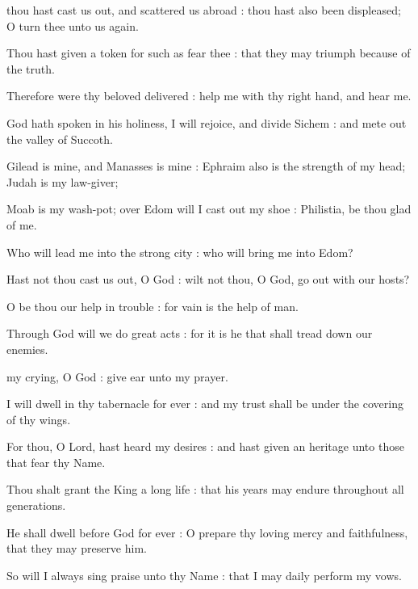 
 thou hast cast us out, and scattered us abroad : thou hast also been displeased; O turn thee unto us again.\par
{}
Thou hast given a token for such as fear thee : that they may triumph because of the truth.\par
{}Therefore were thy beloved delivered : help me with thy right hand, and hear me.\par
{}God hath spoken in his holiness, I will rejoice, and divide Sichem : and mete out the valley of Succoth.\par
{}Gilead is mine, and Manasses is mine : Ephraim also is the strength of my head; Judah is my law-giver;\par
{}Moab is my wash-pot; over Edom will I cast out my shoe : Philistia, be thou glad of me.\par
{}Who will lead me into the strong city : who will bring me into Edom?\par
{}Hast not thou cast us out, O God : wilt not thou, O God, go out with our hosts?\par
{}O be thou our help in trouble : for vain is the help of man.\par
{}Through God will we do great acts : for it is he that shall tread down our enemies.\par


 my crying, O God : give ear unto my prayer.\par
{}
I will dwell in thy tabernacle for ever : and my trust shall be under the covering of thy wings.\par
{}For thou, O Lord, hast heard my desires : and hast given an heritage unto those that fear thy Name.\par
{}Thou shalt grant the King a long life : that his years may endure throughout all generations.\par
{}He shall dwell before God for ever : O prepare thy loving mercy and faithfulness, that they may preserve him.\par
{}So will I always sing praise unto thy Name : that I may daily perform my vows.\par

